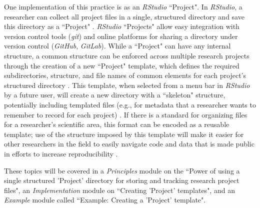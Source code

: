 \documentclass[pdftex,english,11pt,parskip=half]{scrartcl}
\begin{document}
One implementation of this practice is as an \textit{RStudio} ``Project". In \textit{RStudio}, a researcher can collect all project files in a single, structured directory and save this directory as a ``Project" \cite{rstudiousingprojects}. \textit{RStudio} ``Projects" allow easy integration with version control tools (\textit{git}) and online platforms for sharing a directory under version control (\textit{GitHub}, \textit{GitLab}). 
While a ``Project" can have any internal
structure, a common structure can be enforced across multiple research projects
through the creation of a new ``Project" template, which defines the required
subdirectories, structure, and file names of common elements for each project's structured directory \cite{rstudioprojecttemplate}. This template, when selected from a menu bar  in \textit{RStudio} by a
future user, will create a new directory with a ``skeleton" structure,
potentially including templated files (e.g., for metadata that a researcher wants to remember to record for each project) \cite{rstudioprojecttemplate}. If there is a standard for organizing files for a researcher's scientific area, this format can be encoded as a reusable template; use of the structure imposed by this template will make it easier for other researchers in the field to easily navigate code and data that is made public in efforts to increase reproducibility \cite{marwick2018packaging}. 

These topics will be
covered in a \textit{Principles} module on the ``Power of using a single
structured 'Project' directory for storing and tracking research project files",
an \textit{Implementation} module on ``Creating 'Project' templates", and an
\textit{Example} module called ``Example: Creating a 'Project' template".
\end{document}
